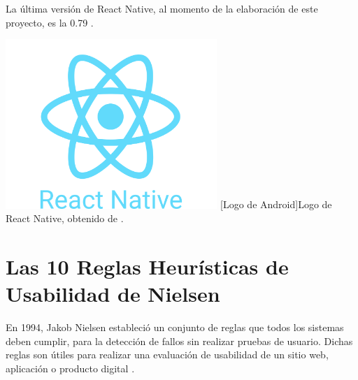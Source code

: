 La última versión de React Native, al momento de la elaboración de este proyecto, es la 0.79 \cite{ref60}.

\begin{center}
    \includegraphics[width=0.6\textwidth]{Images/Cap 2/ReactNative-Logo.png}
    [Logo de Android]{Logo de React Native, obtenido de \cite{ref60}.} 
\end{center}

\section{Las 10 Reglas Heurísticas de Usabilidad de Nielsen}
En 1994, Jakob Nielsen estableció un conjunto de reglas que todos los sistemas deben cumplir, para la detección de fallos sin realizar pruebas de usuario. Dichas reglas son útiles para realizar una evaluación de usabilidad de un sitio web, aplicación o producto digital \cite{ref61}.\\

